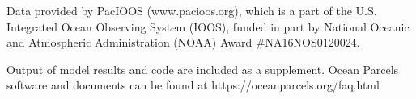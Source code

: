 \documentclass{ametsocV5}
\begin{document}




\acknowledgments
 Data provided by PacIOOS (www.pacioos.org), which is a part of the U.S. Integrated Ocean Observing System (IOOS), funded in part by National Oceanic and Atmospheric Administration (NOAA) Award \#NA16NOS0120024.


% 
%
\datastatement
Output of model results and code are included as a supplement. Ocean Parcels software and documents can be found at https://oceanparcels.org/faq.html

%



\end{document}
